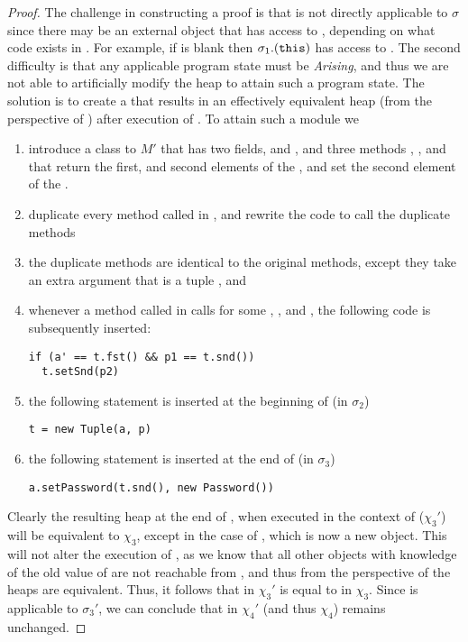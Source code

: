\begin{proof}
The challenge in constructing a proof is that \SrobustB is not directly applicable to $\sigma$ since there may be an external 
object that has access to , depending on what code exists in . For example, if  
is blank then $\sigma_1.({\texttt{this}})$ has access to . The second difficulty is that any applicable program state must be 
\textit{Arising}, and thus we are not able to artificially modify the heap to attain such a program state. The solution is 
to create a  that results in an effectively equivalent heap (from the perspective of ) after execution of . To attain such a module we
\begin{enumerate}
\item
introduce a class  to $M'$ that has two fields,  and , and three methods , , and  that 
return the first, and second elements of the , and set the second element of the .
\item
duplicate every method called in , and rewrite the code to call the duplicate methods
\item
the duplicate methods are identical to the original methods, except they take an extra argument that is a tuple , and
\item
whenever a method called in  calls  for some 
, , and , the following code is subsequently inserted:
\begin{lstlisting}[mathescape=true, language=chainmail, frame=lines]
if (a' == t.fst() && p1 == t.snd())
  t.setSnd(p2)
\end{lstlisting}
\item
the following statement is inserted at the beginning of  (in $\sigma_2$)
\begin{lstlisting}[mathescape=true, language=chainmail, frame=lines]
t = new Tuple(a, p)
\end{lstlisting}
\item
the following statement is inserted at the end of  (in $\sigma_3$)
\begin{lstlisting}[mathescape=true, language=chainmail, frame=lines]
a.setPassword(t.snd(), new Password())
\end{lstlisting}
\end{enumerate}
Clearly the resulting heap at the end of , when executed in the context of  ($\chi_3'$)
will be equivalent to $\chi_3$, except in the case of , which is now a new object.
This will not alter the execution of , as we know that all other objects with knowledge of the old value of  are not reachable from ,
and thus from the perspective of  the heaps are equivalent.
Thus, it follows that  in $\chi_3'$ is equal to  in $\chi_3$.
Since \SrobustB is applicable to $\sigma_3'$, we can conclude that  in $\chi_4'$ (and thus $\chi_4$)
remains unchanged.
\end{proof}




